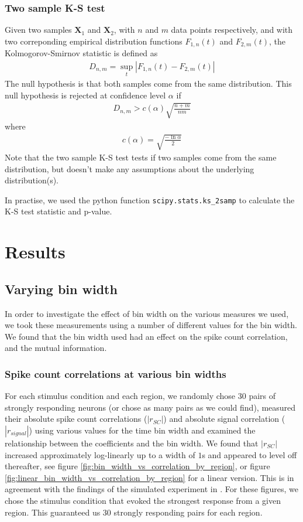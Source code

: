 \documentclass[a4paper,12pt]{article}
\theoremstyle{definition}
\begin{document}
\subsubsection{Two sample K-S test}
Given two samples $\mathbf{X}_1$ and $\mathbf{X}_2$, with $n$ and $m$ data points respectively, and with two correponding empirical distribution functions $F_{1,n}(t)$ and $F_{2,m}(t)$, the Kolmogorov-Smirnov statistic is defined as
\begin{align}
  D_{n,m} = \sup_{t} |F_{1,n}(t) - F_{2,m}(t)|
\end{align}
The null hypothesis is that both samples come from the same distribution. This null hypothesis is rejected at confidence level $\alpha$ if
\begin{align}
  D_{n,m} > c(\alpha)\sqrt{\frac{n+m}{nm}}
\end{align}
where
\begin{align}
  c(\alpha) = \sqrt{\frac{-\ln \alpha}{2}}
\end{align}
Note that the two sample K-S test tests if two samples come from the same distribution, but doesn't make any assumptions about the underlying distribution(s).

In practise, we used the python function \texttt{scipy.stats.ks\_2samp} to calculate the K-S test statistic and p-value.

\section{Results}
\subsection{Varying bin width}
In order to investigate the effect of bin width on the various measures we used, we took these measurements using a number of different values for the bin width. We found that the bin width used had an effect on the spike count correlation, and the mutual information.

\subsubsection{Spike count correlations at various bin widths}\label{sec:corr_vs_bin_widths}
For each stimulus condition and each region, we randomly chose $30$ pairs of strongly responding neurons (or chose as many pairs as we could find), measured their absolute spike count correlations ($|r_{SC}|$) and absolute signal correlation ($|r_{signal}|$) using various values for the time bin width and examined the relationship between the coefficients and the bin width. We found that $|r_{SC}|$ increased approximately log-linearly up to a width of $1$s and appeared to level off thereafter, see figure \ref{fig:bin_width_vs_correlation_by_region}, or figure \ref{fig:linear_bin_width_vs_correlation_by_region} for a linear version. This is in agreement with the findings of the simulated experiment in \cite{cohen}. For these figures, we chose the stimulus condition that evoked the strongest response from a given region. This guaranteed us $30$ strongly responding pairs for each region.
\end{document}
